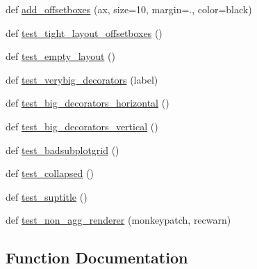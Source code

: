 \begin{DoxyCompactItemize}
\item 
def \hyperlink{namespacematplotlib_1_1tests_1_1test__tightlayout_a056879e5d88f56684d28e9d8b9d0ea87}{add\+\_\+offsetboxes} (ax, size=10, margin=., color=\textquotesingle{}black\textquotesingle{})
\item 
def \hyperlink{namespacematplotlib_1_1tests_1_1test__tightlayout_a04d8d8191778ea42854da9a7d8ebefdd}{test\+\_\+tight\+\_\+layout\+\_\+offsetboxes} ()
\item 
def \hyperlink{namespacematplotlib_1_1tests_1_1test__tightlayout_a16a88d30d49a595343a7eb0101fbccdf}{test\+\_\+empty\+\_\+layout} ()
\item 
def \hyperlink{namespacematplotlib_1_1tests_1_1test__tightlayout_af913b96a130bfd608f7fa18e21e8a726}{test\+\_\+verybig\+\_\+decorators} (label)
\item 
def \hyperlink{namespacematplotlib_1_1tests_1_1test__tightlayout_aeaf73e596b6354125dca01e7a3c2604b}{test\+\_\+big\+\_\+decorators\+\_\+horizontal} ()
\item 
def \hyperlink{namespacematplotlib_1_1tests_1_1test__tightlayout_a88fbf0d0d169d6c51708abe56a43fb11}{test\+\_\+big\+\_\+decorators\+\_\+vertical} ()
\item 
def \hyperlink{namespacematplotlib_1_1tests_1_1test__tightlayout_ad2f7b48e103fcdbac8b17b807d8fd7ac}{test\+\_\+badsubplotgrid} ()
\item 
def \hyperlink{namespacematplotlib_1_1tests_1_1test__tightlayout_ab0b0a49e5033374681b428531f476128}{test\+\_\+collapsed} ()
\item 
def \hyperlink{namespacematplotlib_1_1tests_1_1test__tightlayout_a8113b16c6ab7caa1913f97f50cec7048}{test\+\_\+suptitle} ()
\item 
def \hyperlink{namespacematplotlib_1_1tests_1_1test__tightlayout_a74e922197039e2775a5c31393a53ea44}{test\+\_\+non\+\_\+agg\+\_\+renderer} (monkeypatch, recwarn)
\end{DoxyCompactItemize}


\subsection{Function Documentation}
\mbox{\label{namespacematplotlib_1_1tests_1_1test__tightlayout_a056879e5d88f56684d28e9d8b9d0ea87}} 
